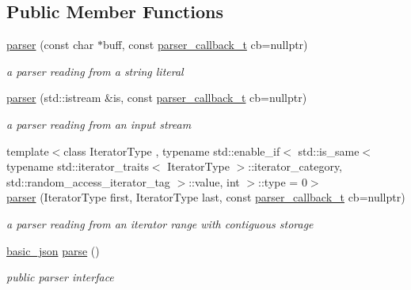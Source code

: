 \subsection*{Public Member Functions}
\begin{DoxyCompactItemize}
\item 
\hypertarget{classnlohmann_1_1basic__json_1_1parser_a12ebdb011909ac2665c07db9c8a337fa}{}\label{classnlohmann_1_1basic__json_1_1parser_a12ebdb011909ac2665c07db9c8a337fa} 
\hyperlink{classnlohmann_1_1basic__json_1_1parser_a12ebdb011909ac2665c07db9c8a337fa}{parser} (const char $\ast$buff, const \hyperlink{classnlohmann_1_1basic__json_a9e35475e2027520a78e09f460dbe048a}{parser\+\_\+callback\+\_\+t} cb=nullptr)
\begin{DoxyCompactList}\small\item\em a parser reading from a string literal \end{DoxyCompactList}\item 
\hypertarget{classnlohmann_1_1basic__json_1_1parser_a6724bcd1644a92ce2d7131ce91bda89a}{}\label{classnlohmann_1_1basic__json_1_1parser_a6724bcd1644a92ce2d7131ce91bda89a} 
\hyperlink{classnlohmann_1_1basic__json_1_1parser_a6724bcd1644a92ce2d7131ce91bda89a}{parser} (std\+::istream \&is, const \hyperlink{classnlohmann_1_1basic__json_a9e35475e2027520a78e09f460dbe048a}{parser\+\_\+callback\+\_\+t} cb=nullptr)
\begin{DoxyCompactList}\small\item\em a parser reading from an input stream \end{DoxyCompactList}\item 
\hypertarget{classnlohmann_1_1basic__json_1_1parser_a8ca2f37f8e97bcf5b851bbb473a8cc29}{}\label{classnlohmann_1_1basic__json_1_1parser_a8ca2f37f8e97bcf5b851bbb473a8cc29} 
{\footnotesize template$<$class Iterator\+Type , typename std\+::enable\+\_\+if$<$ std\+::is\+\_\+same$<$ typename std\+::iterator\+\_\+traits$<$ Iterator\+Type $>$\+::iterator\+\_\+category, std\+::random\+\_\+access\+\_\+iterator\+\_\+tag $>$\+::value, int $>$\+::type  = 0$>$ }\\\hyperlink{classnlohmann_1_1basic__json_1_1parser_a8ca2f37f8e97bcf5b851bbb473a8cc29}{parser} (Iterator\+Type first, Iterator\+Type last, const \hyperlink{classnlohmann_1_1basic__json_a9e35475e2027520a78e09f460dbe048a}{parser\+\_\+callback\+\_\+t} cb=nullptr)
\begin{DoxyCompactList}\small\item\em a parser reading from an iterator range with contiguous storage \end{DoxyCompactList}\item 
\hypertarget{classnlohmann_1_1basic__json_1_1parser_a04063124efe4a97b1330525ab653da3c}{}\label{classnlohmann_1_1basic__json_1_1parser_a04063124efe4a97b1330525ab653da3c} 
\hyperlink{classnlohmann_1_1basic__json}{basic\+\_\+json} \hyperlink{classnlohmann_1_1basic__json_1_1parser_a04063124efe4a97b1330525ab653da3c}{parse} ()
\begin{DoxyCompactList}\small\item\em public parser interface \end{DoxyCompactList}\end{DoxyCompactItemize}
